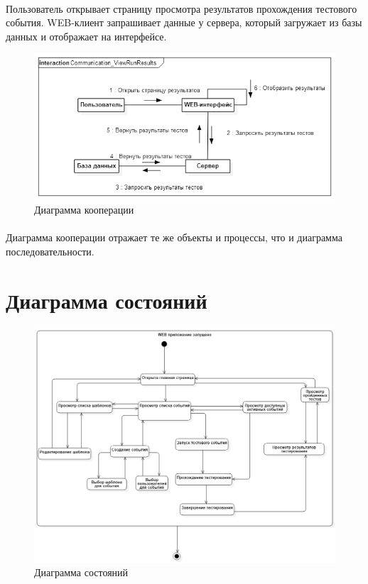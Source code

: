 \documentclass{article}
\begin{document}
        \paragraph{}
        Пользователь открывает страницу просмотра результатов прохождения
        тестового события. WEB-клиент запрашивает данные у сервера, который
        загружает из базы данных и отображает на интерфейсе.
        \begin{figure}[H]
            \includegraphics[width=\textwidth, center]
                {Communication_ViewRunResults}
            \caption{Диаграмма кооперации}
        \end{figure}
        \paragraph{}
        Диаграмма кооперации отражает те же объекты и процессы, что и диаграмма
        последовательности.
    
    
    
    
    \section{Диаграмма состояний}
    \begin{figure}[H]
        \includegraphics[width=\textwidth, center]{Statechart_WEB.png}        
        \caption{Диаграмма состояний}
    \end{figure}
\end{document}
